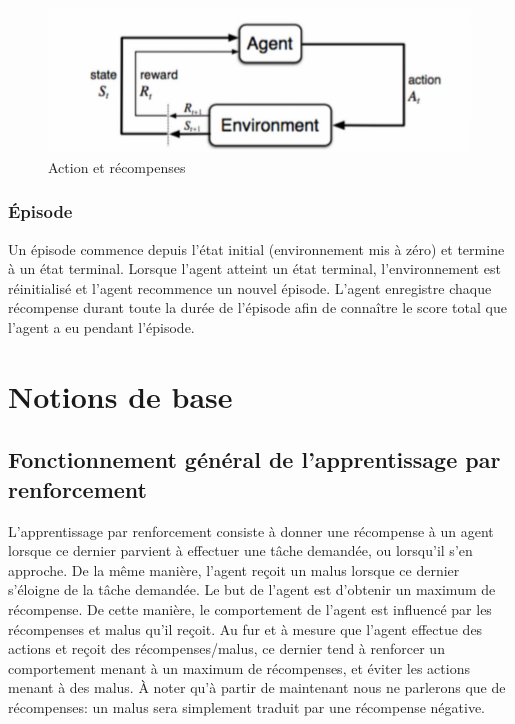 \documentclass[11pt,a4paper]{report}
\begin{document}
    \begin{figure}[!h]
    \center
    \includegraphics[scale=0.5]{ressources/shema_agent_environnement.png}
    \caption{Action et récompenses}
    \end{figure} 
    
  \subsubsection{Épisode}
  
    \par Un épisode commence depuis l'état initial (environnement mis à zéro) et termine à un état terminal. Lorsque l'agent atteint un état terminal, l'environnement est réinitialisé et l'agent recommence un nouvel épisode. L'agent enregistre chaque récompense durant toute la durée de l'épisode afin de connaître le score total que l'agent a eu pendant l'épisode.
    
  \section{Notions de base}
  
  \subsection{Fonctionnement général de l'apprentissage par renforcement}
  
    \par L'apprentissage par renforcement consiste à donner une récompense à un agent lorsque ce dernier parvient à effectuer une tâche demandée, ou lorsqu'il s'en approche. De la même manière, l'agent reçoit un malus lorsque ce dernier s'éloigne de la tâche demandée. Le but de l'agent est d'obtenir un maximum de récompense. De cette manière, le comportement de l'agent est influencé par les récompenses et malus qu'il reçoit. Au fur et à mesure que l'agent effectue des actions et reçoit des récompenses/malus, ce dernier tend à renforcer un comportement menant à un maximum de récompenses, et éviter les actions menant à des malus. À noter qu'à partir de maintenant nous ne parlerons que de récompenses: un malus sera simplement traduit par une récompense négative. 
  
\end{document}
